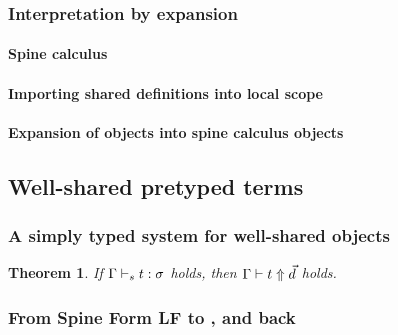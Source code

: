 \documentclass[9pt,authoryear]{sigplanconf}
\newtheorem{theorem}{Theorem}
\begin{document}



\subsubsection{Interpretation by expansion}

\paragraph{Spine calculus}


\paragraph{Importing shared definitions into local scope}


\paragraph{Expansion of {\system} objects into spine calculus objects}



\subsection{Well-shared pretyped terms}

\subsubsection{A simply typed system for well-shared objects}








\begin{theorem}
If $\Gamma \vdash_{s} t : \sigma$ holds, then 
$\Gamma \vdash t \Uparrow \vec{d}$ holds. 
\end{theorem}

\subsubsection{From Spine Form LF to {\system}, and back}
\end{document}
